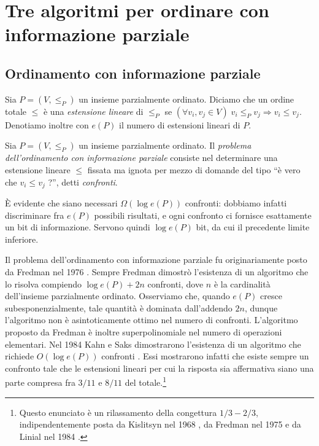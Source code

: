 \chapter{Tre algoritmi per ordinare con informazione parziale}

\section{Ordinamento con informazione parziale} 
\begin{definition}
  Sia \(P=\left(V,\le_{P}\right)\) un insieme parzialmente ordinato. Diciamo 
  che un ordine totale \(\le\) è una \emph{estensione lineare} di \(\le_{P}\) 
  se \((\forall v_i, v_j\in V)\;v_i\le_{P} v_j\Rightarrow v_i\le v_j\). 
  Denotiamo inoltre con \(e(P)\) il numero di estensioni lineari di \(P\). 
\end{definition}
\begin{definition}
  Sia \(P=(V,\le_{P})\) un insieme parzialmente ordinato. Il \emph{problema 
  dell'ordinamento con informazione parziale} consiste nel determinare una 
  estensione lineare \(\le\) fissata ma ignota per mezzo di domande del tipo 
  ``è vero che \(v_i\le v_j\) ?'', detti \emph{confronti}. 
\end{definition}

È evidente che siano necessari \(\Omega(\log{e(P)})\) confronti: dobbiamo 
infatti discriminare fra \(e(P)\) possibili risultati, e ogni confronto ci 
fornisce esattamente un bit di informazione. Servono quindi \(\log{e(P)}\) 
bit, da cui il precedente limite inferiore.

Il problema dell'ordinamento con informazione parziale fu originariamente 
posto da Fredman nel 1976 \cite{Fredman1976}. Sempre Fredman dimostrò 
l'esistenza di un algoritmo che lo risolva compiendo \(\log{e(P)} + 2n\) 
confronti, dove \(n\) è la cardinalità dell'insieme parzialmente ordinato. 
Osserviamo che, quando \(e(P)\) cresce subesponenzialmente, tale quantità è 
dominata dall'addendo \(2n\), dunque l'algoritmo non è asintoticamente ottimo 
nel numero di confronti. L'algoritmo proposto da Fredman è inoltre 
superpolinomiale nel numero di operazioni elementari. Nel 1984 Kahn e Saks 
dimostrarono l'esistenza di un algoritmo che richiede \(O(\log{e(P)})\) 
confronti \cite{Kahn1984}. Essi mostrarono infatti che esiste sempre un 
confronto tale che le estensioni lineari per cui la risposta sia affermativa 
siano una parte compresa fra \(3/11\) e \(8/11\) del totale.\footnote{Questo 
enunciato è un rilassamento della congettura \(1/3-2/3\), indipendentemente 
posta da Kislitsyn nel 1968 \cite{Kislitsyn1968}, da Fredman nel 1975 e da 
Linial nel 1984 \cite{Linial1984}.}

